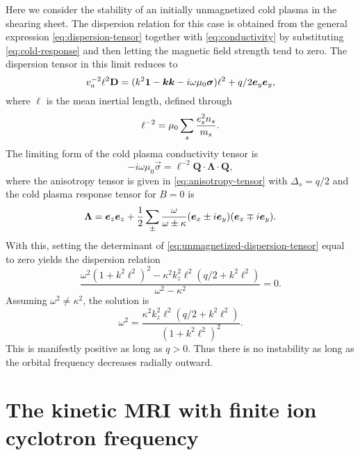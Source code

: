 \documentclass[aps,pre,notitlepage,amsmath,amssymb,amsfonts,nobibnotes,nofootinbib]{revtex4-1}
\begin{document}
Here we consider the stability of an initially unmagnetized cold plasma in the
shearing sheet. The dispersion relation for this case is obtained from the
general expression \cref{eq:dispersion-tensor} together with
\cref{eq:conductivity} by substituting \cref{eq:cold-response} and then
letting the magnetic field strength tend to zero. The dispersion tensor in
this limit reduces to
\begin{equation}
  \label{eq:unmagnetized-dispersion-tensor}
  \va^{-2}\ell^2\mathbf{D} =
  (k^2\mathbf{1} - \vec{k}\vec{k} - i\omega\mu_0\vec{\sigma})\ell^2
  + q/2\ey\ey,
\end{equation}
where $\ell$ is the mean inertial length, defined through
\begin{equation}
  \ell^{-2} = \mu_0\sum_s\frac{e_s^2n_s}{m_s}.
\end{equation}
The limiting form of the cold plasma conductivity tensor is
\begin{equation}
  \label{eq:zero-mag-conductivity}
  -i\omega\mu_0\vec{\sigma} =
  \ell^{-2}\mathbf{Q}\cdot\mathbf{\Lambda}\cdot\mathbf{Q},
\end{equation}
where the anisotropy tensor is given in \cref{eq:anisotropy-tensor} with
$\Delta_s=q/2$ and the cold plasma response tensor for $B=0$ is
\begin{equation}
  \label{eq:zero-mag-response}
  \mathbf{\Lambda} = \ez\ez
  + \frac{1}{2}\sum_{\pm}\frac{\omega}{\omega\pm\kappa}
  (\ex\pm i\ey)(\ex\mp i\ey).
\end{equation}
With this, setting the determinant of \cref{eq:unmagnetized-dispersion-tensor}
equal to zero yields the dispersion relation
\begin{equation}
  \frac{\omega^2{(1 + k^2\ell^2)}^2 - \kappa^2 k_z^2\ell^2(q/2 + k^2\ell^2)}
  {\omega^2 - \kappa^2} = 0.
\end{equation}
Assuming $\omega^2\ne\kappa^2$, the solution is
\begin{equation}
  \omega^2 =
  \frac{\kappa^2k_z^2\ell^2(q/2 + k^2\ell^2)}{{(1 + k^2\ell^2)}^2}.
\end{equation}
This is manifestly positive as long as $q>0$. Thus there is no instability as
long as the orbital frequency decreases radially outward.

\section{The kinetic MRI with finite ion cyclotron frequency}
\label{sec:MRI-finite-cyc}
\end{document}
